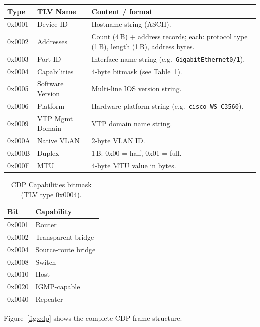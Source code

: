 \documentclass[12pt,a4paper]{article}
\begin{document}
\begin{center}
\begin{tabular}{lll}
\toprule
\textbf{Type} & \textbf{TLV Name}     & \textbf{Content / format} \\
\midrule
0x0001 & Device ID         & Hostname string (ASCII). \\
0x0002 & Addresses         & Count (4\,B) + address records; each: protocol type (1\,B),
                             length (1\,B), address bytes. \\
0x0003 & Port ID           & Interface name string (e.g.\ \texttt{GigabitEthernet0/1}). \\
0x0004 & Capabilities      & 4-byte bitmask (see Table~\ref{tab:cdpcap}). \\
0x0005 & Software Version  & Multi-line IOS version string. \\
0x0006 & Platform          & Hardware platform string (e.g.\ \texttt{cisco WS-C3560}). \\
0x0009 & VTP Mgmt Domain   & VTP domain name string. \\
0x000A & Native VLAN       & 2-byte VLAN ID. \\
0x000B & Duplex            & 1\,B: 0x00 = half, 0x01 = full. \\
0x000F & MTU               & 4-byte MTU value in bytes. \\
\bottomrule
\end{tabular}
\end{center}

\begin{table}[H]
\centering
\caption{CDP Capabilities bitmask (TLV type 0x0004).}
\label{tab:cdpcap}
\begin{tabular}{ll}
\toprule
\textbf{Bit} & \textbf{Capability} \\
\midrule
0x0001 & Router \\
0x0002 & Transparent bridge \\
0x0004 & Source-route bridge \\
0x0008 & Switch \\
0x0010 & Host \\
0x0020 & IGMP-capable \\
0x0040 & Repeater \\
\bottomrule
\end{tabular}
\end{table}

Figure~\ref{fig:cdp} shows the complete CDP frame structure.
\end{document}
